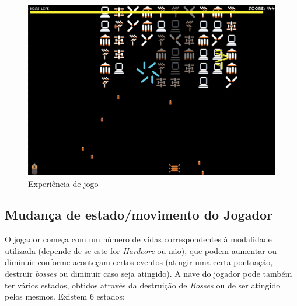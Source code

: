 \documentclass[a4paper,11pt]{article}
\newcommand\tab[1][0.8cm]{\hspace*{#1}}
\begin{document}
\begin{figure}[H]
    \centering
    \includegraphics[scale = 0.60]{1 - Imagens/GameExperience.png}
    \caption{Experiência de jogo}
    \label{fig:GameExperience}
\end{figure}

\vspace{8pt}

\subsection{Mudança de estado/movimento do Jogador}
\tab O jogador começa com um número de vidas correspondentes à modalidade utilizada (depende de se este for \textit{Hardcore} ou não), que podem aumentar ou diminuir conforme aconteçam certos eventos (atingir uma certa pontuação, destruir \textit{bosses} ou diminuir caso seja atingido). A nave do jogador pode também ter vários estados, obtidos através da destruição de \textit{Bosses} ou de ser atingido pelos mesmos. Existem 6 estados:

\vspace{8pt}
\end{document}

